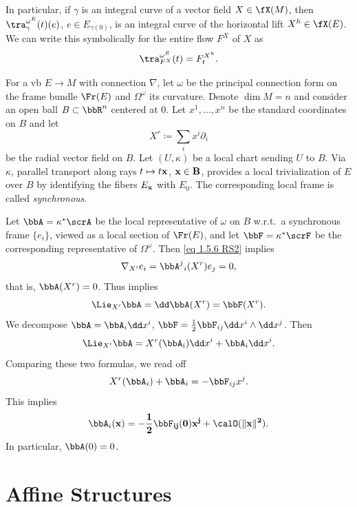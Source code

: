 \begin{rem}
    In particular, if $\gamma$ is an integral curve of a vector field $X\in\fX(M)$, then $\tra_\gamma^{\omega^E}(t)(e)$, $e\in E_{\gamma(0)}$, is an integral curve of the horizontal lift $X^h\in\fX(E)$. We can write this symbolically for the entire flow $F^X$ of $X$ as 
    \[\tra^{\omega^E}_{F^X}(t)=F_t^{X^h}.\]
\end{rem}

\begin{rem}\label{rem 1.7.19 RS2}
    For a \gls{vb} $E\to M$ with connection $\nabla$, let $\omega$  be the principal connection form on the frame bundle $\Fr(E)$ and $\Omega^\omega$ its curvature. Denote $\dim M=n$ and consider an open ball $B\subset \bbR^n$ centered at $0$. Let $x^1,\ldots,x^n$ be the standard coordinates on $B$ and let
    \[X^r\coloneqq \sum_i x^i\partial_i\]
    be the radial vector field on $B$. Let $(U,\kappa)$ be a local chart sending $U$ to $B$. Via $\kappa$, parallel transport along rays $t\mapsto t\bf{x}$, $\bf{x}\in B$, provides a local trivialization of $E$ over $B$ by identifying the fibers $E_{\bf{x}}$ with $E_0$. The corresponding local frame is called \emph{synchronous}.

    Let $\bbA=\kappa^\ast\scrA$ be the local representative of $\omega$ on $B$ w.r.t.\ a synchronous frame $\{e_i\}$, viewed as a local section of $\Fr(E)$, and let $\bbF=\kappa^\ast \scrF$ be the corresponding representative of  $\Omega^\omega$. Then \eqref{eq 1.5.6 RS2} implies 
    \[\nabla_{X'}e_i=\bbA^j{}_i(X^r)e_j=0,\]
    that is, $\bbA(X^r)=0$. Thus implies
    \[\Lie_{X'}\bbA=\dd\bbA(X^r)=\bbF(X^r).\]
    We decompose $\bbA=\bbA_i\dd x^i$, $\bbF=\frac12 \bbF_{ij}\dd x^i\wedge \dd x^j$. Then
    \[\Lie_{X'}\bbA=X^r(\bbA_i)\dd x^i+\bbA_i\dd x^i.\]
    Comparing these two formulas, we read off
    \[X^r(\bbA_i)+\bbA_i=-\bbF_{ij}x^j.\]
    This implies
    \[\bbA_i(\bf{x})=-\frac12\bbF_{ij}(0)x^j+\calO(\lVert\bf{x}\rVert^2).\]
    In particular, $\bbA(0)=0$. 
\end{rem}







\chapter{Affine Structures}\label{ch affine structures}


